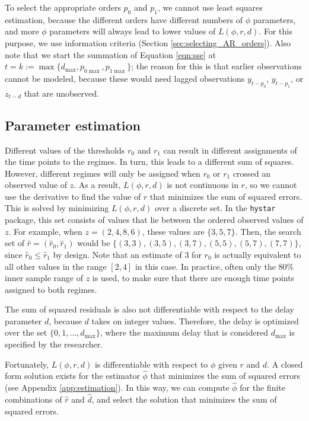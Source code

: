 \documentclass{article}
\begin{document}
To select the appropriate orders $p_0$ and $p_1$, we cannot use least squares estimation, because the different orders have different numbers of $\phi$ parameters, and more $\phi$ parameters will always lead to lower values of $L(\phi, r, d)$. For this purpose, we use information criteria (Section \ref{sec:selecting_AR_orders}).
Also note that we start the summation of Equation \ref{eqn:sse} at $t = k :=\max\{d_{\max}, p_{0\max}, p_{1\max}\}$; the reason for this is that earlier observations cannot be modeled, because these would need lagged observations $y_{t-p_0}$, $y_{t-p_1}$, or $z_{t-d}$ that are unobserved.

\subsection{Parameter estimation} 
\label{sec:estimation}
Different values of the thresholds $r_0$ and $r_1$ can result in different assignments of the time points to the regimes. In turn, this leads to a different sum of squares. 
However, different regimes will only be assigned when $r_0$ or $r_1$ crossed an observed value of $z$. 
As a result, $L(\phi, r, d)$ is not continuous in $r$, so we cannot use the derivative to find the value of $r$ that minimizes the sum of squared errors.
This is solved by minimizing $L(\phi, r, d)$ over a discrete set. 
In the \texttt{hystar} package, this set consists of values that lie between the ordered observed values of $z$.
For example, when $z = (2, 4, 8, 6)$, these values are $\{3, 5, 7\}$.
Then, the search set of $\hat{r} = (\hat{r}_0, \hat{r}_1)$ would be $\{(3, 3), (3, 5), (3, 7), (5,5), (5, 7), (7, 7)\}$, since $\hat{r}_0 \le \hat{r}_1$ by design. Note that an estimate of 3 for $r_0$ is actually equivalent to all other values in the range $[2, 4]$ in this case.
In practice, often only the 80\% inner sample range of $z$ is used, to make sure that there are enough time points assigned to both regimes.

The sum of squared residuals is also not differentiable with respect to the delay parameter $d$, because $d$ takes on integer values. Therefore, the delay is optimized over the set $\{0, 1, \dots, d_{\max}\}$, where the maximum delay that is considered $d_{\max}$ is specified by the researcher.

Fortunately, $L(\phi, r, d)$ is differentiable with respect to $\phi$ given $r$ and $d$. A closed form solution exists for the estimator $\hat{\phi}$ that minimizes the sum of squared errors (see Appendix \ref{app:estimation}). 
In this way, we can compute $\hat{\phi}$ for the finite combinations of $\hat{r}$ and $\hat{d}$, and select the solution that minimizes the sum of squared errors.
\end{document}
